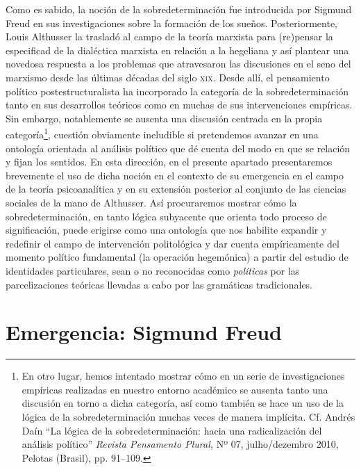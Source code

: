 Como es sabido, la noción de la sobredeterminación fue introducida por Sigmund Freud en sus investigaciones sobre la formación de los sueños. Posteriormente, Louis Althusser la trasladó al campo de la teoría marxista para (re)pensar la especificad de la dialéctica marxista en relación a la hegeliana y así plantear una novedosa respuesta a los problemas que atravesaron las discusiones en el seno del marxismo desde las últimas décadas del siglo \textsc{xix}. Desde allí, el pensamiento político postestructuralista ha incorporado la categoría de la sobredeterminación tanto en sus desarrollos teóricos como en muchas de sus intervenciones empíricas. Sin embargo, notablemente se ausenta una discusión centrada en la propia categoría\footnote{En otro lugar, hemos intentado mostrar cómo en un serie de investigaciones empíricas realizadas en nuestro entorno académico se ausenta tanto una discusión en torno a dicha categoría, así como también se hace un uso de la lógica de la sobredeterminación muchas veces de manera implícita. Cf. Andrés Daín \enquote{La lógica de la sobredeterminación: hacia una radicalización del análisis político} \emph{Revista Pensamento Plural,} Nº 07, julho/dezembro 2010, Pelotas (Brasil), pp. 91--109.}, cuestión obviamente ineludible si pretendemos avanzar en una ontología orientada al análisis político que dé cuenta del modo en que se relación y fijan los sentidos. En esta dirección, en el presente apartado presentaremos brevemente el uso de dicha noción en el contexto de su emergencia en el campo de la teoría psicoanalítica y en su extensión posterior al conjunto de las ciencias sociales de la mano de Althusser. Así procuraremos mostrar cómo la sobredeterminación, en tanto lógica subyacente que orienta todo proceso de significación, puede erigirse como una ontología que nos habilite expandir y redefinir el campo de intervención politológica y dar cuenta empíricamente del momento político fundamental (la operación hegemónica) a partir del estudio de identidades particulares, sean o no reconocidas como \emph{políticas} por las parcelizaciones teóricas llevadas a cabo por las gramáticas tradicionales.

\section{Emergencia: Sigmund Freud}

